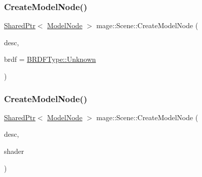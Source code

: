 \subsubsection{\texorpdfstring{Create\+Model\+Node()}{CreateModelNode()}\hspace{0.1cm}{\footnotesize\ttfamily [1/2]}}
{\footnotesize\ttfamily \hyperlink{namespacemage_a1e01ae66713838a7a67d30e44c67703e}{Shared\+Ptr}$<$ \hyperlink{classmage_1_1_model_node}{Model\+Node} $>$ mage\+::\+Scene\+::\+Create\+Model\+Node (\begin{DoxyParamCaption}\item[{const \hyperlink{classmage_1_1_model_descriptor}{Model\+Descriptor} \&}]{desc,  }\item[{\hyperlink{namespacemage_ae7a7a03a7b34d7e2689689bb8295cd38}{B\+R\+D\+F\+Type}}]{brdf = {\ttfamily \hyperlink{namespacemage_ae7a7a03a7b34d7e2689689bb8295cd38a88183b946cc5f0e8c96b2e66e1c74a7e}{B\+R\+D\+F\+Type\+::\+Unknown}} }\end{DoxyParamCaption})}

\hypertarget{classmage_1_1_scene_ae21a831a792ab16b1459cfa8b65a2508}{}\label{classmage_1_1_scene_ae21a831a792ab16b1459cfa8b65a2508} 
\subsubsection{\texorpdfstring{Create\+Model\+Node()}{CreateModelNode()}\hspace{0.1cm}{\footnotesize\ttfamily [2/2]}}
{\footnotesize\ttfamily \hyperlink{namespacemage_a1e01ae66713838a7a67d30e44c67703e}{Shared\+Ptr}$<$ \hyperlink{classmage_1_1_model_node}{Model\+Node} $>$ mage\+::\+Scene\+::\+Create\+Model\+Node (\begin{DoxyParamCaption}\item[{const \hyperlink{classmage_1_1_model_descriptor}{Model\+Descriptor} \&}]{desc,  }\item[{const \hyperlink{structmage_1_1_combined_shader}{Combined\+Shader} \&}]{shader }\end{DoxyParamCaption})}

\hypertarget{classmage_1_1_scene_a370f5ce63a6277a1369c1545f0acbffa}{}\label{classmage_1_1_scene_a370f5ce63a6277a1369c1545f0acbffa} 
